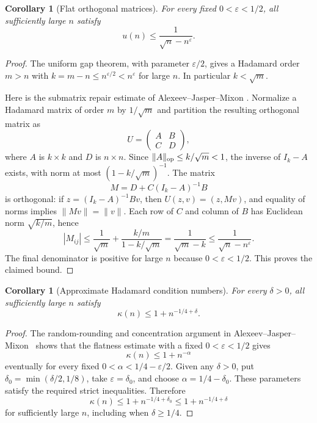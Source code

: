 \documentclass[11pt]{article}
\newtheorem{corollary}[theorem]{Corollary}
\newcommand{\eps}{\varepsilon}
\begin{document}
\begin{corollary}[Flat orthogonal matrices]\label{cor:flat}
For every fixed $0<\eps<1/2$, all sufficiently large $n$ satisfy
\[
u(n)\le \frac{1}{\sqrt n-n^{\eps}}.
\]
\end{corollary}

\begin{proof}
The uniform gap theorem, with parameter $\varepsilon/2$, gives a Hadamard
order $m>n$ with $k=m-n\le n^{\varepsilon/2}<n^{\varepsilon}$ for large
$n$. In particular $k<\sqrt m$.

Here is the submatrix repair estimate of Alexeev--Jasper--Mixon
\cite[Lemmas 3 and 4]{Alexeev2025}. Normalize a Hadamard matrix of order
$m$ by $1/\sqrt m$ and partition the resulting orthogonal matrix as
\[
U=\begin{pmatrix}A&B\\C&D\end{pmatrix},
\]
where $A$ is $k\times k$ and $D$ is $n\times n$. Since
$\|A\|_{\rm op}\le k/\sqrt m<1$, the inverse of $I_k-A$ exists, with norm
at most $(1-k/\sqrt m)^{-1}$. The matrix
\[
M=D+C(I_k-A)^{-1}B
\]
is orthogonal: if $z=(I_k-A)^{-1}Bv$, then
$U(z,v)=(z,Mv)$, and equality of norms implies $\|Mv\|=\|v\|$.
Each row of $C$ and column of $B$ has Euclidean norm $\sqrt{k/m}$, hence
\[
|M_{ij}|\le\frac1{\sqrt m}+
\frac{k/m}{1-k/\sqrt m}=\frac1{\sqrt m-k}
\le\frac1{\sqrt n-n^{\varepsilon}}.
\]
The final denominator is positive for large $n$ because
$0<\varepsilon<1/2$. This proves the claimed bound.
\end{proof}

\begin{corollary}[Approximate Hadamard condition numbers]\label{cor:kappa}
For every $\delta>0$, all sufficiently large $n$ satisfy
\begin{equation}\label{eq:kappa}
\kappa(n)\le1+n^{-1/4+\delta}.
\end{equation}
\end{corollary}

\begin{proof}
The random-rounding and concentration argument in
Alexeev--Jasper--Mixon~\cite[proof of Theorem 1]{Alexeev2025} shows that
the flatness estimate with a fixed $0<\varepsilon<1/2$ gives
\[
\kappa(n)\le1+n^{-\alpha}
\]
eventually for every fixed $0<\alpha<1/4-\varepsilon/2$.
Given any $\delta>0$, put $\delta_0=\min(\delta/2,1/8)$, take
$\varepsilon=\delta_0$, and choose $\alpha=1/4-\delta_0$.
These parameters satisfy the required strict inequalities. Therefore
\[
\kappa(n)\le1+n^{-1/4+\delta_0}\le1+n^{-1/4+\delta}
\]
for sufficiently large $n$, including when $\delta\ge1/4$.
\end{proof}
\end{document}
